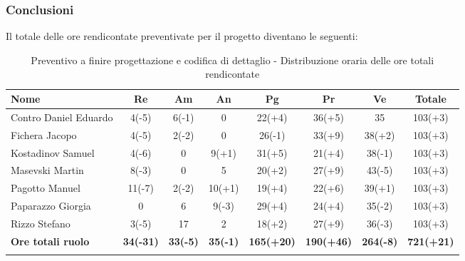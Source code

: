 \documentclass[../piano_di_progetto.tex]{subfiles}
\begin{document}
\subsubsection{Conclusioni}%
\label{sub:cons_con_4}
Il totale delle ore rendicontate preventivate per il progetto diventano le seguenti:
\begin{center}
	\begin{longtable}{|l|c|c|c|c|c|c|c|}
		\hline
		\rowcolor{lightgray}
		\textbf{Nome} & \textbf{Re} & \textbf{Am} & \textbf{An} & \textbf{Pg}  & \textbf{Pr}   & \textbf{Ve} & \textbf{Totale} \\

		\hline
			Contro Daniel Eduardo & 4(-5) & 6(-1) & 0 & 22(+4) & 36(+5) & 35 & 103(+3) \\
			Fichera Jacopo & 4(-5) & 2(-2) & 0 & 26(-1) & 33(+9) & 38(+2) & 103(+3) \\
			Kostadinov Samuel & 4(-6) & 0 & 9(+1) & 31(+5) & 21(+4) & 38(-1) & 103(+3) \\		
			Masevski Martin & 8(-3) & 0 & 5 & 20(+2) & 27(+9) & 43(-5) & 103(+3) \\
			Pagotto Manuel & 11(-7) & 2(-2) & 10(+1) & 19(+4) & 22(+6) & 39(+1) & 103(+3) \\			
			Paparazzo Giorgia & 0 & 6 & 9(-3) & 29(+4) & 24(+4) & 35(-2) & 103(+3) \\
			Rizzo Stefano & 3(-5) & 17 & 2 & 18(+2) & 27(+9) & 36(-3) & 103(+3) \\
			\hline
			\textbf{Ore totali ruolo} & \textbf{34(-31)} & \textbf{33(-5)} & \textbf{35(-1)} & \textbf{165(+20)} & \textbf{190(+46)} & \textbf{264(-8)} & \textbf{721(+21)} \\
		\hline	
		\rowcolor{white}
		\caption{Preventivo a finire progettazione e codifica di dettaglio - Distribuzione oraria delle ore totali rendicontate}
	\end{longtable}
\end{center}
\end{document}
